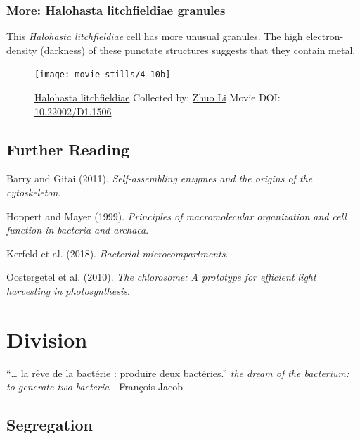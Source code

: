 \documentclass[]{tufte-book}
\begin{document}
\hypertarget{Halohasta_litchfieldiae_granules}{\subsection*{More:
Halohasta litchfieldiae
granules}\label{Halohasta_litchfieldiae_granules}}

This \emph{Halohasta litchfieldiae} cell has more unusual granules. The
high electron-density (darkness) of these punctate structures suggests
that they contain metal.





\begin{figure}
\texttt{[image: movie\_stills/4\_10b]} \caption[\protect\hyperlink{tree}{Halohasta litchfieldiae} Collected
by: \protect\hyperlink{zhuo_li}{Zhuo Li} Movie DOI:
\href{https://doi.org/10.22002/D1.1506}{10.22002/D1.1506}]{\protect\hyperlink{tree}{Halohasta litchfieldiae} Collected
by: \protect\hyperlink{zhuo_li}{Zhuo Li} Movie DOI:
\href{https://doi.org/10.22002/D1.1506}{10.22002/D1.1506}}\label{fig:4-10b}
\end{figure}

\section{Further Reading}\label{further-reading}

Barry and Gitai (2011). \emph{Self-assembling enzymes and the origins of
the cytoskeleton}.\citep{barry2011}

Hoppert and Mayer (1999). \emph{Principles of macromolecular
organization and cell function in bacteria and
archaea}.\citep{hoppert1999}

Kerfeld et al. (2018). \emph{Bacterial
microcompartments}.\citep{kerfeld2018}

Oostergetel et al. (2010). \emph{The chlorosome: A prototype for
efficient light harvesting in photosynthesis}.\citep{oostergetel2010}

\chapter{Division}\label{division}

``\ldots{} la rêve de la bactérie : produire deux bactéries.'' \emph{the
dream of the bacterium: to generate two bacteria} - François Jacob
\citep{jacob2002a}

\section{Segregation}\label{segregation}
\end{document}
